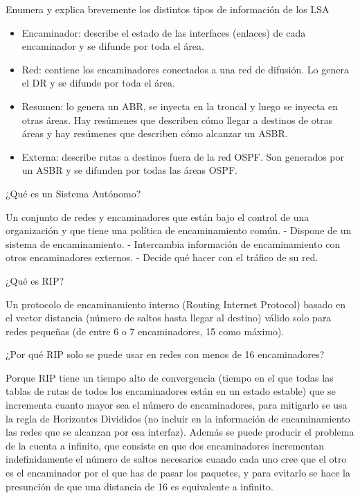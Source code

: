 \documentclass[]{article}
\providecommand{\tightlist}{%
  \setlength{\itemsep}{0pt}\setlength{\parskip}{0pt}}
\begin{document}
Enumera y explica brevemente los distintos tipos de información de los
LSA

\begin{itemize}
\tightlist
\item
  Encaminador: describe el estado de las interfaces (enlaces) de cada
  encaminador y se difunde por toda el área.
\item
  Red: contiene los encaminadores conectados a una red de difusión. Lo
  genera el DR y se difunde por toda el área.
\item
  Resumen: lo genera un ABR, se inyecta en la troncal y luego se inyecta
  en otras áreas. Hay resúmenes que describen cómo llegar a destinos de
  otras áreas y hay resúmenes que describen cómo alcanzar un ASBR.
\item
  Externa: describe rutas a destinos fuera de la red OSPF. Son generados
  por un ASBR y se difunden por todas las áreas OSPF.
\end{itemize}

¿Qué es un Sistema Autónomo?

Un conjunto de redes y encaminadores que están bajo el control de una
organización y que tiene una política de encaminamiento común. - Dispone
de un sistema de encaminamiento. - Intercambia información de
encaminamiento con otros encaminadores externos. - Decide qué hacer con
el tráfico de su red.

¿Qué es RIP?

Un protocolo de encaminamiento interno (Routing Internet Protocol)
basado en el vector distancia (número de saltos hasta llegar al destino)
válido solo para redes pequeñas (de entre 6 o 7 encaminadores, 15 como
máximo).

¿Por qué RIP solo se puede usar en redes con menos de 16 encaminadores?

Porque RIP tiene un tiempo alto de convergencia (tiempo en el que todas
las tablas de rutas de todos los encaminadores están en un estado
estable) que se incrementa cuanto mayor sea el número de encaminadores,
para mitigarlo se usa la regla de Horizontes Divididos (no incluir en la
información de encaminamiento las redes que se alcanzan por esa
interfaz). Además se puede producir el problema de la cuenta a infinito,
que consiste en que dos encaminadores incrementan indefinidamente el
número de saltos necesarios cuando cada uno cree que el otro es el
encaminador por el que has de pasar los paquetes, y para evitarlo se
hace la presunción de que una distancia de 16 es equivalente a infinito.
\end{document}
